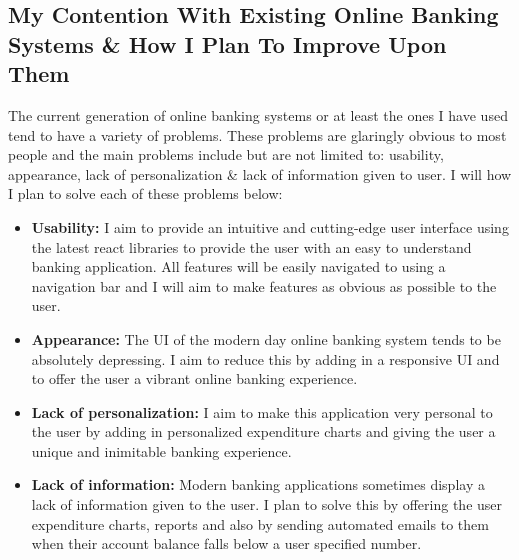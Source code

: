 \subsection{My Contention With Existing Online Banking Systems \& How I Plan To Improve Upon Them}
The current generation of online banking systems or at least the ones I have used
tend to have a variety of problems.  These problems are glaringly obvious to most
people and the main problems include but are not limited to: usability, appearance, lack of
personalization \& lack of information given to user.  I will how I plan to solve each of
these problems below:
\begin{itemize}
\item \textbf{Usability:} I aim to provide an intuitive and cutting-edge user
interface using the latest react libraries to provide the user with an easy to
understand banking application.  All features will be easily navigated to using
a navigation bar and I will aim to make features as obvious as possible to the user.
\item \textbf{Appearance:} The UI of the modern day online banking system tends
to be absolutely depressing.  I aim to reduce this by adding in a responsive UI
and to offer the user a vibrant online banking experience.
\item \textbf{Lack of personalization:} I aim to make this application very personal
to the user by adding in personalized expenditure charts and giving the user a
unique and inimitable banking experience.
\item \textbf{Lack of information:} Modern banking applications sometimes display
a lack of information given to the user.  I plan to solve this by offering the user
expenditure charts, reports and also by sending automated emails to them when
their account balance falls below a user specified number.
\end{itemize}
